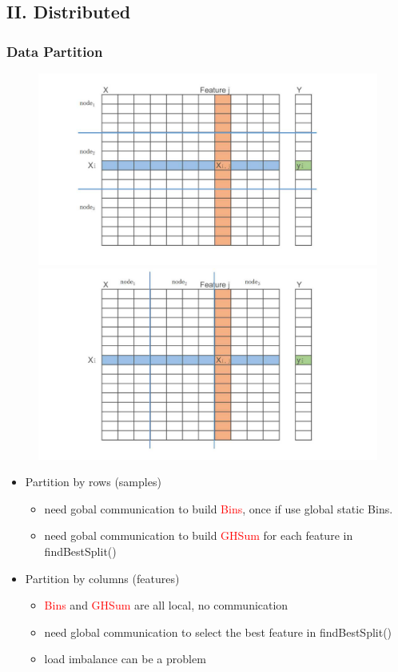 \documentclass{beamer}
\begin{document}
\subsection{II. Distributed} 
\begin{frame}
	\frametitle{Data Partition}
		\begin{figure}
			\includegraphics[width=.5\linewidth]{figs/datapartition1.jpg}
			\includegraphics[width=.5\linewidth]{figs/datapartition2.jpg}
		\end{figure}
		

		\begin{itemize}
			\item Partition by rows (samples) 
			\begin{itemize}			
				\item need gobal communication to build \textcolor{red}{Bins}, once if use global static Bins.
				\item need gobal communication to build \textcolor{red}{GHSum} for each feature in findBestSplit() 
			\end{itemize}			
			\item Partition by columns (features)
			\begin{itemize}			
				\item \textcolor{red}{Bins} and \textcolor{red}{GHSum} are all local, no communication
				\item need global communication to select the best feature in findBestSplit()
				\item load imbalance can be a problem
			\end{itemize}			
			
		\end{itemize}
	
\end{frame}
\end{document}
